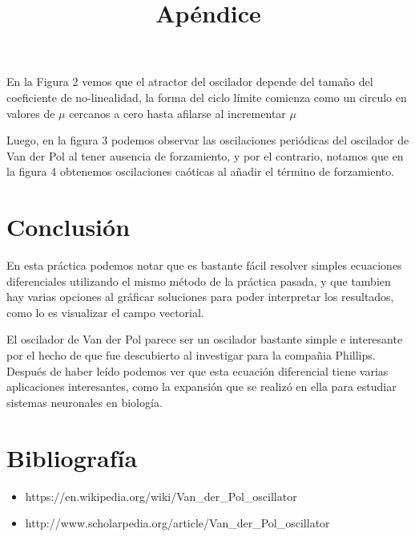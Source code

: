 \documentclass{article}
\begin{document}
En la Figura 2 vemos que el atractor del oscilador depende del tamaño del coeficiente de no-linealidad, la forma del ciclo límite comienza como un circulo en valores de $\mu$ cercanos a cero hasta afilarse al incrementar $\mu$

Luego, en la figura 3 podemos observar las oscilaciones periódicas del oscilador de Van der Pol al tener ausencia de forzamiento, y por el contrario, notamos que en la figura 4 obtenemos oscilaciones caóticas al añadir el término de forzamiento.

\section{Conclusión}

En esta práctica podemos notar que es bastante fácil resolver simples ecuaciones diferenciales utilizando el mismo método de la práctica pasada, y que tambien hay varias opciones al gráficar soluciones para poder interpretar los resultados, como lo es visualizar el campo vectorial.

El oscilador de Van der Pol parece ser un oscilador bastante simple e interesante por el hecho de que fue descubierto al investigar para la compañia Phillips. Después de haber leído podemos ver que esta ecuación diferencial tiene varias aplicaciones interesantes, como la expansión que se realizó en ella para estudiar sistemas neuronales en biología.

\newpage

\section{Bibliografía}
\begin{itemize}
\item https://en.wikipedia.org/wiki/Van\_der\_Pol\_oscillator
\item http://www.scholarpedia.org/article/Van\_der\_Pol\_oscillator
\end{itemize}

\newpage

\title{Apéndice}
\end{document}
